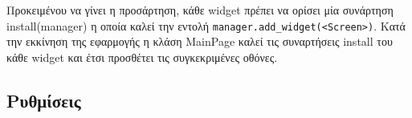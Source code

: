 Προκειμένου να γίνει η προσάρτηση, κάθε widget πρέπει να ορίσει μία συνάρτηση install(manager) η οποία καλεί την εντολή \texttt{manager.add\_widget(<Screen>)}. Κατά την εκκίνηση της εφαρμογής η κλάση MainPage καλεί τις συναρτήσεις install του κάθε widget και έτσι προσθέτει τις συγκεκριμένες οθόνες.

\subsection{Ρυθμίσεις}
